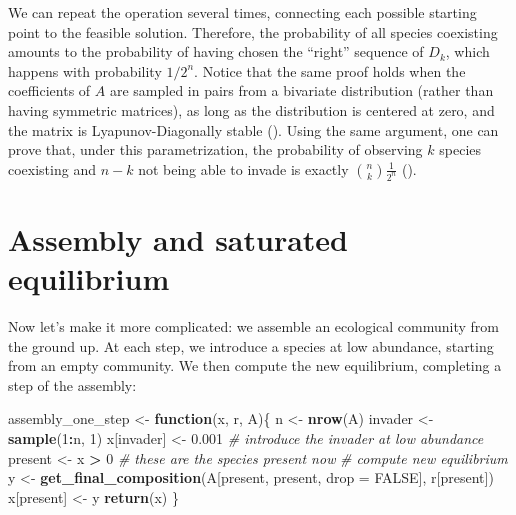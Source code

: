 \documentclass[]{book}
\newenvironment{Shaded}{\begin{snugshade}}{\end{snugshade}}
\newcommand{\CommentTok}[1]{\textcolor[rgb]{0.56,0.35,0.01}{\textit{#1}}}
\newcommand{\ControlFlowTok}[1]{\textcolor[rgb]{0.13,0.29,0.53}{\textbf{#1}}}
\newcommand{\DataTypeTok}[1]{\textcolor[rgb]{0.13,0.29,0.53}{#1}}
\newcommand{\DecValTok}[1]{\textcolor[rgb]{0.00,0.00,0.81}{#1}}
\newcommand{\FloatTok}[1]{\textcolor[rgb]{0.00,0.00,0.81}{#1}}
\newcommand{\KeywordTok}[1]{\textcolor[rgb]{0.13,0.29,0.53}{\textbf{#1}}}
\newcommand{\NormalTok}[1]{#1}
\newcommand{\OperatorTok}[1]{\textcolor[rgb]{0.81,0.36,0.00}{\textbf{#1}}}
\newcommand{\OtherTok}[1]{\textcolor[rgb]{0.56,0.35,0.01}{#1}}
\newcommand{\StringTok}[1]{\textcolor[rgb]{0.31,0.60,0.02}{#1}}
\begin{document}
We can repeat the operation several times, connecting each possible starting point to the feasible solution. Therefore, the probability of all species coexisting amounts to the probability of having chosen the ``right'' sequence of \(D_k\), which happens with probability \(1 / 2^n\). Notice that the same proof holds when the coefficients of \(A\) are sampled in pairs from a bivariate distribution (rather than having symmetric matrices), as long as the distribution is centered at zero, and the matrix is Lyapunov-Diagonally stable (\citet{servan2018coexistence}). Using the same argument, one can prove that, under this parametrization, the probability of observing \(k\) species coexisting and \(n -k\) not being able to invade is exactly \(\binom{n}{k} \frac{1}{2^n}\) (\citet{servan2018coexistence}).

\hypertarget{assembly-and-saturated-equilibrium}{%
\section{Assembly and saturated equilibrium}\label{assembly-and-saturated-equilibrium}}

Now let's make it more complicated: we assemble an ecological community from the ground up. At each step, we introduce a species at low abundance, starting from an empty community. We then compute the new equilibrium, completing a step of the assembly:

\begin{Shaded}
\begin{Highlighting}[]
\NormalTok{assembly_one_step <-}\StringTok{ }\ControlFlowTok{function}\NormalTok{(x, r, A)\{}
\NormalTok{  n <-}\StringTok{ }\KeywordTok{nrow}\NormalTok{(A)}
\NormalTok{  invader <-}\StringTok{ }\KeywordTok{sample}\NormalTok{(}\DecValTok{1}\OperatorTok{:}\NormalTok{n, }\DecValTok{1}\NormalTok{)}
\NormalTok{  x[invader] <-}\StringTok{ }\FloatTok{0.001} \CommentTok{# introduce the invader at low abundance}
\NormalTok{  present <-}\StringTok{ }\NormalTok{x }\OperatorTok{>}\StringTok{ }\DecValTok{0} \CommentTok{# these are the species present now}
  \CommentTok{# compute new equilibrium}
\NormalTok{  y <-}\StringTok{ }\KeywordTok{get_final_composition}\NormalTok{(A[present, present, }\DataTypeTok{drop =} \OtherTok{FALSE}\NormalTok{], r[present])}
\NormalTok{  x[present] <-}\StringTok{ }\NormalTok{y}
  \KeywordTok{return}\NormalTok{(x)}
\NormalTok{\}}
\end{Highlighting}
\end{Shaded}
\end{document}
